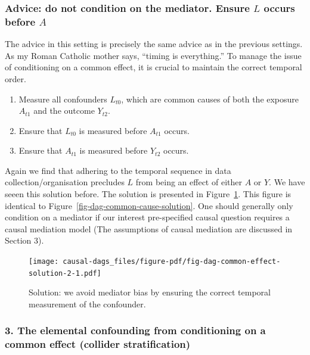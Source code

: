 \documentclass[
  singlecolumn,
  9pt]{article}
\providecommand{\tightlist}{%
  \setlength{\itemsep}{0pt}\setlength{\parskip}{0pt}}\usepackage{longtable,booktabs,array}
\begin{document}
\subsubsection{\texorpdfstring{Advice: do not condition on the mediator.
Ensure \(L\) occurs before
\(A\)}{Advice: do not condition on the mediator. Ensure L occurs before A}}\label{advice-do-not-condition-on-the-mediator.-ensure-l-occurs-before-a}

The advice in this setting is precisely the same advice as in the
previous settings. As my Roman Catholic mother says, ``timing is
everything.'' To manage the issue of conditioning on a common effect, it
is crucial to maintain the correct temporal order.

\begin{enumerate}
\def\labelenumi{\arabic{enumi}.}
\tightlist
\item
  Measure all confounders \(L_{t0}\), which are common causes of both
  the exposure \(A_{t1}\) and the outcome \(Y_{t2}\).
\item
  Ensure that \(L_{t0}\) is measured before \(A_{t1}\) occurs.
\item
  Ensure that \(A_{t1}\) is measured before \(Y_{t2}\) occurs.
\end{enumerate}

Again we find that adhering to the temporal sequence in data
collection/organisation precludes \(L\) from being an effect of either
\(A\) or \(Y\). We have seeen this solution before. The solution is
presented in Figure~\ref{fig-dag-common-effect-solution-2}. This figure
is identical to Figure~\ref{fig-dag-common-cause-solution}. One should
generally only condition on a mediator if our interest pre-specified
causal question requires a causal mediation model (The assumptions of
causal mediation are discussed in Section 3).

\begin{figure}

{\centering \texttt{[image: causal-dags\_files/figure-pdf/fig-dag-common-effect-solution-2-1.pdf]}

}

\caption{\label{fig-dag-common-effect-solution-2}Solution: we avoid
mediator bias by ensuring the correct temporal measurement of the
confounder.}

\end{figure}

\subsubsection{3. The elemental confounding from conditioning on a
common effect (collider
stratification)}\label{the-elemental-confounding-from-conditioning-on-a-common-effect-collider-stratification}
\end{document}
